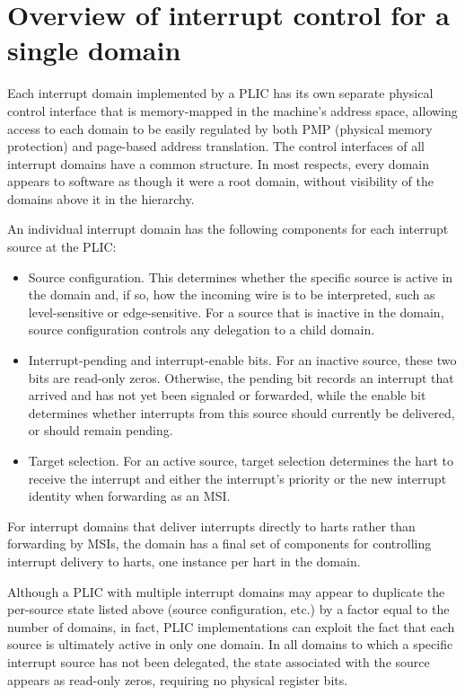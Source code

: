 \section{Overview of interrupt control for a single domain}

Each interrupt domain implemented by a PLIC has its own separate
physical control interface that is memory-mapped in the machine's
address space, allowing access to each domain to be easily regulated
by both PMP (physical memory protection) and page-based address
translation.
The control interfaces of all interrupt domains have a common
structure.
In most respects, every domain appears to software as though it were
a root domain, without visibility of the domains above it in the
hierarchy.

An individual interrupt domain has the following components for each
interrupt source at the PLIC:
\begin{itemize}

\item
Source configuration.
This determines whether the specific source is active in the domain
and, if so, how the incoming wire is to be interpreted, such as
level-sensitive or edge-sensitive.
For a source that is inactive in the domain, source configuration
controls any delegation to a child domain.

\item
Interrupt-pending and interrupt-enable bits.
For an inactive source, these two bits are read-only zeros.
Otherwise, the pending bit records an interrupt that arrived and has
not yet been signaled or forwarded, while the enable bit determines
whether interrupts from this source should currently be delivered, or
should remain pending.

\item
Target selection.
For an active source, target selection determines the hart to receive
the interrupt and either the interrupt's priority or the new interrupt
identity when forwarding as an MSI.

\end{itemize}

For interrupt domains that deliver interrupts directly to harts rather
than forwarding by MSIs, the domain has a final set of components for
controlling interrupt delivery to harts, one instance per hart in the
domain.

\begin{commentary}
Although a PLIC with multiple interrupt domains may appear to duplicate
the per-source state listed above (source configuration, etc.) by a
factor equal to the number of domains, in fact, PLIC implementations
can exploit the fact that each source is ultimately active in only one
domain.
In all domains to which a specific interrupt source has not been
delegated, the state associated with the source appears as read-only
zeros, requiring no physical register bits.
\end{commentary}

